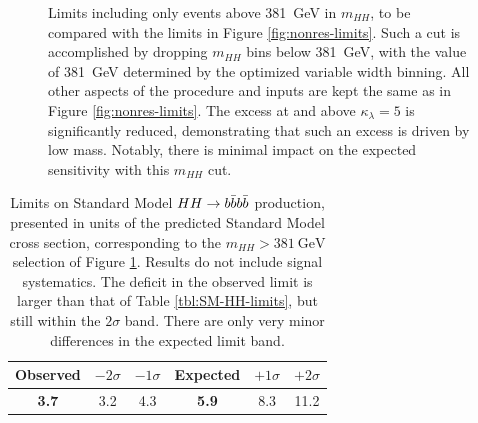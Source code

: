 \begin{figure}[ht]
  \centering
  \caption{\label{fig:nonres-limits-with-cut} Limits including only events above \SI{381}{\GeV} in $m_{HH}$, 
  to be compared with the limits in Figure \ref{fig:nonres-limits}. Such a cut is accomplished by 
  dropping $m_{HH}$ bins below \SI{381}{\GeV}, with the value 
  of \SI{381}{\GeV} determined by the optimized variable width binning. All other aspects of the procedure 
  and inputs are kept the same as in Figure \ref{fig:nonres-limits}. The excess 
  at and above $\kappa_{\lambda} = 5$ is significantly reduced, demonstrating that such an excess is driven by 
  low mass. Notably, there is minimal impact on the expected sensitivity with this $m_{HH}$ cut.
  }
\end{figure}

\begin{table}
\centering
\begin{tabular}{ |c|c|c|c|c|c| } 
\hline
\textbf{Observed} & $-2\sigma$ & $-1\sigma$ & \textbf{Expected} & $+1\sigma$ & $+2\sigma$\\
 \hline
\textbf{3.7}	& 3.2	& 4.3 & \textbf{5.9}	& 8.3 & 11.2\\
 \hline
\end{tabular}
 \caption{\label{tbl:SM-HH-limits-mhh-cut} Limits on Standard Model $HH\rightarrow b\bar{b}b\bar{b}$ production, 
 presented in units of the predicted Standard Model cross section, corresponding to the $m_{HH} > \SI{381}{\GeV}$ 
 selection of Figure \ref{fig:nonres-limits-with-cut}. Results do not include signal systematics. The deficit 
 in the observed limit is larger than that of Table \ref{tbl:SM-HH-limits}, but still within the $2\sigma$ band. There 
 are only very minor differences in the expected limit band.}
\end{table}

